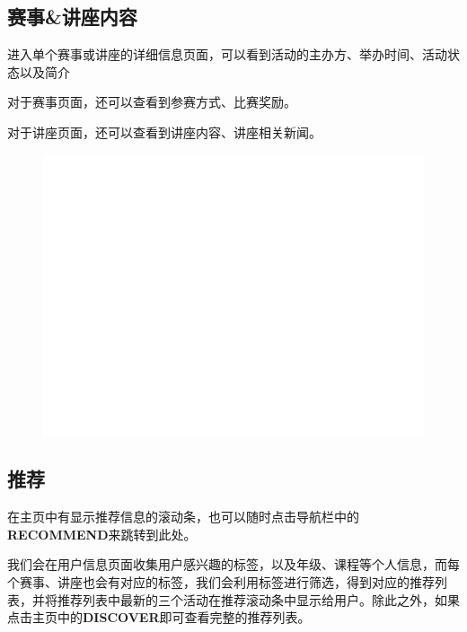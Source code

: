 \documentclass[UTF8]{ctexart}
\begin{document}
\newpage
\subsection{赛事\&讲座内容}

进入单个赛事或讲座的详细信息页面，可以看到活动的主办方、举办时间、活动状态以及简介

对于赛事页面，还可以查看到参赛方式、比赛奖励。

对于讲座页面，还可以查看到讲座内容、讲座相关新闻。

\begin{figure}[h]
    \centering
    \includegraphics[width=\textwidth]{manual_images//temp.png}
\end{figure}

\newpage
\subsection{推荐}

在主页中有显示推荐信息的滚动条，也可以随时点击导航栏中的{\bfseries RECOMMEND}来跳转到此处。

我们会在用户信息页面收集用户感兴趣的标签，以及年级、课程等个人信息，而每个赛事、讲座也会有对应的标签，我们会利用标签进行筛选，得到对应的推荐列表，并将推荐列表中最新的三个活动在推荐滚动条中显示给用户。除此之外，如果点击主页中的{\bfseries DISCOVER}即可查看完整的推荐列表。
\end{document}
